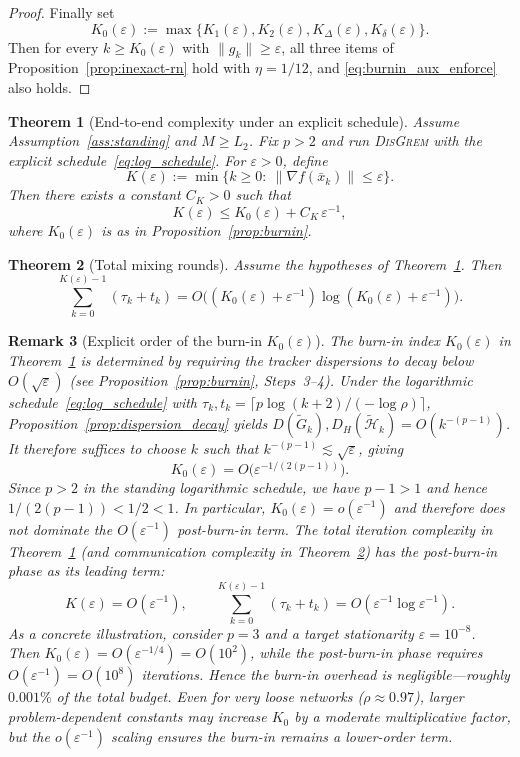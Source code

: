\documentclass[11pt,a4paper]{article}
\def\cO{O}%
\newtheorem{theorem}{Theorem}[section]
\newtheorem{remark}[theorem]{Remark}
\newcommand{\cO}{\mathcal{O}}
\begin{document}
\begin{proof}
\smallskip
Finally set
\[
K_0(\varepsilon):=\max\{K_1(\varepsilon),K_2(\varepsilon),K_\Delta(\varepsilon),K_\delta(\varepsilon)\}.
\]
Then for every $k\ge K_0(\varepsilon)$ with $\|g_k\|\ge \varepsilon$, all three items of Proposition~\ref{prop:inexact-rn} hold with $\eta=1/12$,
and \eqref{eq:burnin_aux_enforce} also holds.
\end{proof}

\begin{theorem}[End-to-end complexity under an explicit schedule]\label{thm:end2end}
Assume Assumption~\ref{ass:standing} and $M\ge L_2$. Fix $p>2$ and run \textsc{DisGrem} with the explicit schedule~\eqref{eq:log_schedule}.
For $\varepsilon>0$, define
\[
K(\varepsilon):=\min\{k\ge 0:\ \|\nabla f(\bar x_k)\|\le \varepsilon\}.
\]
Then there exists a constant $C_K>0$ such that
\[
K(\varepsilon)\le K_0(\varepsilon)+C_K\,\varepsilon^{-1},
\]
where $K_0(\varepsilon)$ is as in Proposition~\ref{prop:burnin}.
\end{theorem}

\begin{theorem}[Total mixing rounds]\label{thm:comm}
Assume the hypotheses of Theorem~\ref{thm:end2end}. Then
\[
\sum_{k=0}^{K(\varepsilon)-1}(\tau_k+t_k)
=\cO\!\Big((K_0(\varepsilon)+\varepsilon^{-1})\log(K_0(\varepsilon)+\varepsilon^{-1})\Big).
\]
\end{theorem}

\begin{remark}[Explicit order of the burn-in $K_0(\varepsilon)$]\label{rem:burnin_order_app}
The burn-in index $K_0(\varepsilon)$ in Theorem~\ref{thm:end2end} is
determined by requiring the tracker dispersions to decay below
$\cO(\sqrt\varepsilon)$ (see Proposition~\ref{prop:burnin}, Steps~3--4).
Under the logarithmic schedule~\eqref{eq:log_schedule} with
$\tau_k,t_k=\lceil p\log(k+2)/(-\log\rho)\rceil$,
Proposition~\ref{prop:dispersion_decay} yields
$D(\tilde G_k),D_H(\tilde{\mathcal H}_k)=\cO(k^{-(p-1)})$.
It therefore suffices to choose $k$ such that $k^{-(p-1)}\lesssim\sqrt\varepsilon$,
giving
\[
K_0(\varepsilon)=\cO\!\big(\varepsilon^{-1/(2(p-1))}\big).
\]
Since $p>2$ in the standing logarithmic schedule, we have $p-1>1$
and hence $1/(2(p-1))<1/2<1$.
In particular, $K_0(\varepsilon)=o(\varepsilon^{-1})$ and therefore
\emph{does not dominate} the $\cO(\varepsilon^{-1})$ post-burn-in term.
The total iteration complexity in Theorem~\ref{thm:end2end}
(and communication complexity in Theorem~\ref{thm:comm}) has the
post-burn-in phase as its leading term:
\[
K(\varepsilon)=\cO(\varepsilon^{-1}),
\qquad
\sum_{k=0}^{K(\varepsilon)-1}(\tau_k+t_k)
=\cO(\varepsilon^{-1}\log\varepsilon^{-1}).
\]
As a concrete illustration, consider $p=3$ and a target stationarity
$\varepsilon=10^{-8}$.
Then $K_0(\varepsilon)=\cO(\varepsilon^{-1/4})=\cO(10^{2})$,
while the post-burn-in phase requires $\cO(\varepsilon^{-1})=\cO(10^{8})$
iterations.
Hence the burn-in overhead is negligible---roughly $0.001\%$
of the total budget.
Even for very loose networks ($\rho\approx0.97$), larger
problem-dependent constants may increase $K_0$ by a moderate
multiplicative factor, but the $o(\varepsilon^{-1})$ scaling ensures
the burn-in remains a lower-order term.
\end{remark}
\end{document}
